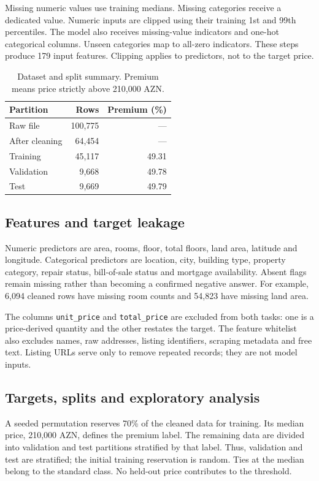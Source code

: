 \documentclass[10pt,twocolumn,a4paper]{article}
\begin{document}
Missing numeric values use training medians. Missing categories receive a dedicated value. Numeric inputs are clipped using their training 1st and 99th percentiles. The model also receives missing-value indicators and one-hot categorical columns. Unseen categories map to all-zero indicators. These steps produce 179 input features. Clipping applies to predictors, not to the target price.

\begin{table}[t]\centering\small
\caption{Dataset and split summary. Premium means price strictly above 210,000 AZN.}\label{tab:data}
\begin{tabular}{@{}lrr@{}}\toprule
Partition & Rows & Premium (\%)\\\midrule
Raw file & 100,775 & ---\\
After cleaning & 64,454 & ---\\
Training & 45,117 & 49.31\\
Validation & 9,668 & 49.78\\
Test & 9,669 & 49.79\\\bottomrule
\end{tabular}
\end{table}

\subsection{Features and target leakage}
Numeric predictors are area, rooms, floor, total floors, land area, latitude and longitude. Categorical predictors are location, city, building type, property category, repair status, bill-of-sale status and mortgage availability. Absent flags remain missing rather than becoming a confirmed negative answer. For example, 6,094 cleaned rows have missing room counts and 54,823 have missing land area.

The columns \texttt{unit\_price} and \texttt{total\_price} are excluded from both tasks: one is a price-derived quantity and the other restates the target. The feature whitelist also excludes names, raw addresses, listing identifiers, scraping metadata and free text. Listing URLs serve only to remove repeated records; they are not model inputs.

\subsection{Targets, splits and exploratory analysis}
A seeded permutation reserves 70\% of the cleaned data for training. Its median price, 210,000 AZN, defines the premium label. The remaining data are divided into validation and test partitions stratified by that label. Thus, validation and test are stratified; the initial training reservation is random. Ties at the median belong to the standard class. No held-out price contributes to the threshold.
\end{document}
